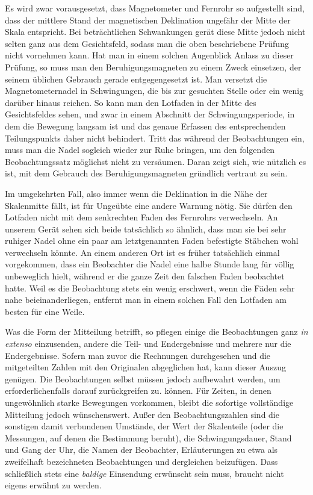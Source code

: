 Es wird zwar vorausgesetzt, dass Magnetometer und Fernrohr so aufgestellt sind, dass der mittlere Stand der magnetischen Deklination ungefähr der Mitte der Skala entspricht. Bei beträchtlichen Schwankungen gerät diese Mitte jedoch nicht selten ganz aus dem Gesichtsfeld, sodass man die oben beschriebene Prüfung nicht vornehmen kann. Hat man in einem solchen Augenblick Anlass zu dieser Prüfung, so muss man den Beruhigungsmagneten zu einem Zweck einsetzen, der seinem üblichen Gebrauch gerade entgegengesetzt ist. Man versetzt die Magnetometernadel in Schwingungen, die bis zur gesuchten Stelle oder ein wenig darüber hinaus reichen. So kann man den Lotfaden in der Mitte des Gesichtsfeldes sehen, und zwar in einem Abschnitt der Schwingungsperiode, in dem die Bewegung langsam ist und das genaue Erfassen des entsprechenden Teilungspunkts daher nicht behindert. Tritt das während der Beobachtungen ein, muss man die Nadel sogleich wieder zur Ruhe bringen, um den folgenden Beobachtungssatz möglichst nicht zu versäumen. Daran zeigt sich, wie nützlich es ist, mit dem Gebrauch des Beruhigungsmagneten gründlich vertraut zu sein.

Im umgekehrten Fall, also immer wenn die Deklination in die Nähe der Skalenmitte fällt, ist für Ungeübte eine andere Warnung nötig. Sie dürfen den Lotfaden nicht mit dem senkrechten Faden des Fernrohrs verwechseln. An unserem Gerät sehen sich beide tatsächlich so ähnlich, dass man sie bei sehr ruhiger Nadel ohne ein paar am letztgenannten Faden befestigte Stäbchen wohl verwechseln könnte. An einem anderen Ort ist es früher tatsächlich einmal vorgekommen, dass ein Beobachter die Nadel eine halbe Stunde lang für völlig unbeweglich hielt, während er die ganze Zeit den falschen Faden beobachtet hatte. Weil es die Beobachtung stets ein wenig erschwert, wenn die Fäden sehr nahe beieinanderliegen, entfernt man in einem solchen Fall den Lotfaden am besten für eine Weile.

Was die Form der Mitteilung betrifft, so pflegen einige die Beobachtungen ganz \textit{in extenso} einzusenden, andere die Teil- und Endergebnisse und mehrere nur die Endergebnisse. Sofern man zuvor die Rechnungen durchgesehen und die mitgeteilten Zahlen mit den Originalen abgeglichen hat, kann dieser Auszug genügen. Die Beobachtungen selbst müssen jedoch aufbewahrt werden, um erforderlichenfalls
darauf zurückgreifen zu. können. Für Zeiten, in denen ungewöhnlich starke Bewegungen vorkommen, bleibt die sofortige vollständige Mitteilung jedoch wünschenswert. Außer den Beobachtungszahlen sind die sonstigen damit verbundenen Umstände, der Wert der Skalenteile (oder die Messungen, auf denen die Bestimmung beruht), die Schwingungsdauer, Stand und Gang der Uhr, die Namen der Beobachter, Erläuterungen zu etwa als zweifelhaft bezeichneten Beobachtungen und dergleichen beizufügen. Dass schließlich stets eine \textit{baldige} Einsendung erwünscht sein muss, braucht nicht eigens erwähnt zu werden.

